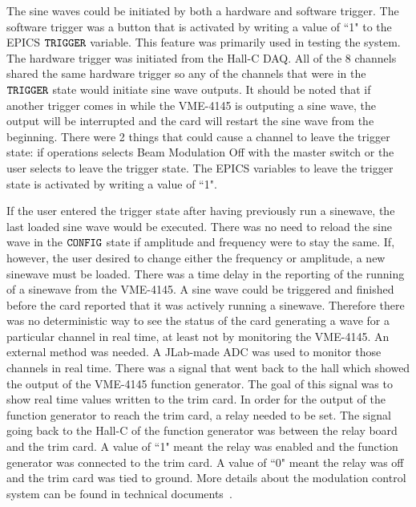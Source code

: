 The sine waves could be initiated by both a hardware and software trigger. The software trigger was a button that is activated by writing a value of ``1" to the EPICS ${\tt TRIGGER}$ variable. This feature was primarily used in testing the system. The hardware trigger was initiated from the Hall-C DAQ. All of the 8 channels shared the same hardware trigger so any of the channels that were in the ${\tt TRIGGER}$ state would initiate sine wave outputs. It should be noted that if another trigger comes in while the VME-4145 is outputing a sine wave, the output will be interrupted and the card will restart the sine wave from the beginning. There were 2 things that could cause a channel to leave the trigger state: if operations selects Beam Modulation Off with the master switch or the user selects to leave the trigger state. The EPICS variables to leave the trigger state is activated by writing a value of ``1". 

If the user entered the trigger state after having previously run a sinewave, the last loaded sine wave would be executed. There was no need to reload the sine wave in the ${\tt CONFIG}$ state if amplitude and frequency were to stay the same. If, however, the user desired to change either the frequency or amplitude, a new sinewave must be loaded. There was a time delay in the reporting of the running of a sinewave from the VME-4145. A sine wave could be triggered and finished before the card reported that it was actively running a sinewave. Therefore there was no deterministic way to see the status of the card generating a wave for a particular channel in real time, at least not by monitoring the VME-4145. An external method was needed. A JLab-made ADC was used to monitor those channels in real time. There was a signal that went back to the hall which showed the output of the VME-4145 function generator. The goal of this signal was to show real time values written to the trim card. In order for the output of the function generator to reach the trim card, a relay needed to be set. The signal going back to the Hall-C of the function generator was between the relay board and the trim card. 
A value of ``1" meant the relay was enabled and the function generator was connected to the trim card. A value of ``0" meant the relay was off and the trim card was tied to ground. More details about the modulation control system can be found in technical documents~\cite{nur_bm_controls, nur_bm_GUI_proposal}.


